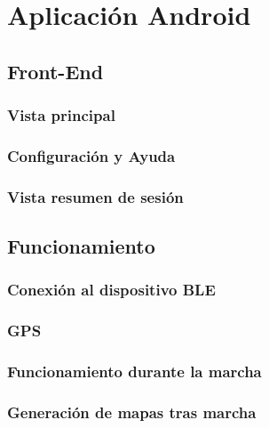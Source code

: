 \cleardoublepage

\chapter{Aplicación Android}
\label{makereference5}

\section{Front-End}
\label{makereference5.1}

\subsection{Vista principal}
\label{makereference5.1.1}

\subsection{Configuración y Ayuda}
\label{makereference5.1.2}

\subsection{Vista resumen de sesión}
\label{makereference5.1.3}

\section{Funcionamiento}
\label{makereference5.2}

\subsection{Conexión al dispositivo BLE}
\label{makereference5.2.1}

\subsection{GPS}
\label{makereference5.2.2}

\subsection{Funcionamiento durante la marcha}
\label{makereference5.2.3}

\subsection{Generación de mapas tras marcha}
\label{makereference5.2.4}